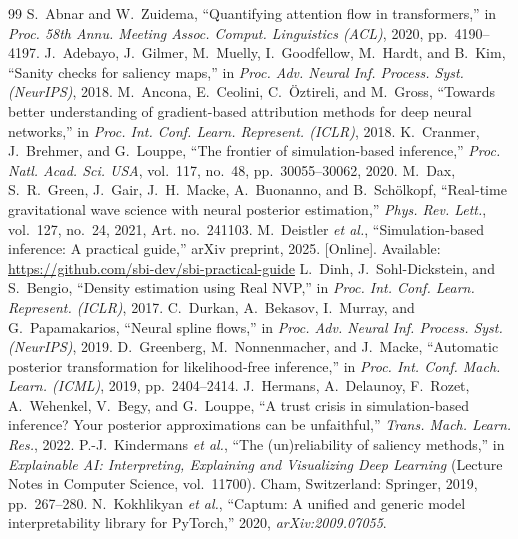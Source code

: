 \documentclass[conference]{IEEEtran}
\begin{document}
\begin{thebibliography}{99}
 S.~Abnar and W.~Zuidema, ``Quantifying attention flow in transformers,'' in \emph{Proc. 58th Annu. Meeting Assoc. Comput. Linguistics (ACL)}, 2020, pp.~4190--4197.
 J.~Adebayo, J.~Gilmer, M.~Muelly, I.~Goodfellow, M.~Hardt, and B.~Kim, ``Sanity checks for saliency maps,'' in \emph{Proc. Adv. Neural Inf. Process. Syst. (NeurIPS)}, 2018.
 M.~Ancona, E.~Ceolini, C.~\"Oztireli, and M.~Gross, ``Towards better understanding of gradient-based attribution methods for deep neural networks,'' in \emph{Proc. Int. Conf. Learn. Represent. (ICLR)}, 2018.
 K.~Cranmer, J.~Brehmer, and G.~Louppe, ``The frontier of simulation-based inference,'' \emph{Proc. Natl. Acad. Sci. USA}, vol.~117, no.~48, pp.~30055--30062, 2020.
 M.~Dax, S.~R.~Green, J.~Gair, J.~H.~Macke, A.~Buonanno, and B.~Sch\"olkopf, ``Real-time gravitational wave science with neural posterior estimation,'' \emph{Phys. Rev. Lett.}, vol.~127, no.~24, 2021, Art. no.~241103.
 M.~Deistler \emph{et al.}, ``Simulation-based inference: A practical guide,'' arXiv preprint, 2025. [Online]. Available: \url{https://github.com/sbi-dev/sbi-practical-guide}
 L.~Dinh, J.~Sohl-Dickstein, and S.~Bengio, ``Density estimation using Real NVP,'' in \emph{Proc. Int. Conf. Learn. Represent. (ICLR)}, 2017.
 C.~Durkan, A.~Bekasov, I.~Murray, and G.~Papamakarios, ``Neural spline flows,'' in \emph{Proc. Adv. Neural Inf. Process. Syst. (NeurIPS)}, 2019.
 D.~Greenberg, M.~Nonnenmacher, and J.~Macke, ``Automatic posterior transformation for likelihood-free inference,'' in \emph{Proc. Int. Conf. Mach. Learn. (ICML)}, 2019, pp.~2404--2414.
 J.~Hermans, A.~Delaunoy, F.~Rozet, A.~Wehenkel, V.~Begy, and G.~Louppe, ``A trust crisis in simulation-based inference? Your posterior approximations can be unfaithful,'' \emph{Trans. Mach. Learn. Res.}, 2022.
 P.-J.~Kindermans \emph{et al.}, ``The (un)reliability of saliency methods,'' in \emph{Explainable AI: Interpreting, Explaining and Visualizing Deep Learning} (Lecture Notes in Computer Science, vol.~11700). Cham, Switzerland: Springer, 2019, pp.~267--280.
 N.~Kokhlikyan \emph{et al.}, ``Captum: A unified and generic model interpretability library for PyTorch,'' 2020, \emph{arXiv:2009.07055}.

\end{thebibliography}
\end{document}
